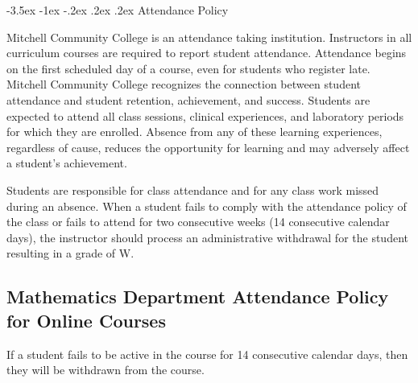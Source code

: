 \documentclass{article}
\makeatletter
\renewcommand\section{\@startsection{section}{1}{0pt}%
  {-3.5ex \@plus -1ex \@minus -.2ex}%
  {.2ex \@plus.2ex}%
  {\normalfont\Large\bfseries}} %
\makeatother
\begin{document}
\section{Attendance Policy}

Mitchell Community College is an attendance taking institution. Instructors in all curriculum courses are required to report student attendance. Attendance begins on the first scheduled day of a course, even for students who register late. Mitchell Community College recognizes the connection between student attendance and student retention, achievement, and success. Students are expected to attend all class sessions, clinical experiences, and laboratory periods for which they are enrolled. Absence from any of these learning experiences, regardless of cause, reduces the opportunity for learning and may adversely affect a student's achievement.

Students are responsible for class attendance and for any class work missed during an absence. When a student fails to comply with the attendance policy of the class or fails to attend for two consecutive weeks (14 consecutive calendar days), the instructor should process an administrative withdrawal for the student resulting in a grade of W.

\subsection{Mathematics Department Attendance Policy for Online Courses}

If a student fails to be active in the course for 14 consecutive calendar days, then they will be withdrawn from the course.
\end{document}
